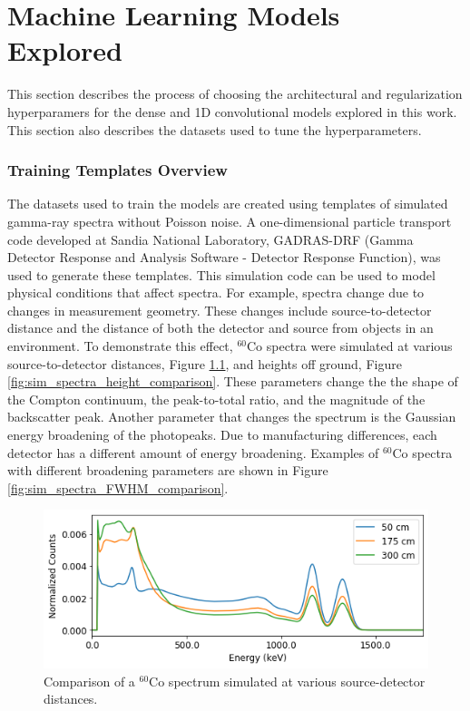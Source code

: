 \chapter{Machine Learning Models Explored}

This section describes the process of choosing the architectural and regularization hyperparamers for the dense and 1D convolutional models explored in this work. This section also describes the datasets used to tune the hyperparameters.


\subsection{Training Templates Overview}

The datasets used to train the models are created using templates of simulated gamma-ray spectra without Poisson noise. A one-dimensional particle transport code developed at Sandia National Laboratory, GADRAS-DRF (Gamma Detector Response and Analysis Software - Detector Response Function), was used to generate these templates. This simulation code can be used to model physical conditions that affect spectra. For example, spectra change due to changes in measurement geometry. These changes include source-to-detector distance and the distance of both the detector and source from objects in an environment. To demonstrate this effect, $^{60}$Co spectra were simulated at various source-to-detector distances, Figure \ref{fig:sim_spectra_distance_comparison}, and heights off ground, Figure \ref{fig:sim_spectra_height_comparison}. These parameters change the the shape of the Compton continuum, the peak-to-total ratio, and the magnitude of the backscatter peak. Another parameter that changes the spectrum is the Gaussian energy broadening of the photopeaks. Due to manufacturing differences, each detector has a different amount of energy broadening. Examples of $^{60}$Co spectra with different broadening parameters are shown in Figure \ref{fig:sim_spectra_FWHM_comparison}.


\begin{figure}[H]
\centering
\includegraphics[width=0.75\linewidth]{images/sim_spectra_distance_comparison}
\caption{Comparison of a $^{60}$Co spectrum simulated at various source-detector distances.}
\label{fig:sim_spectra_distance_comparison}
\end{figure}

